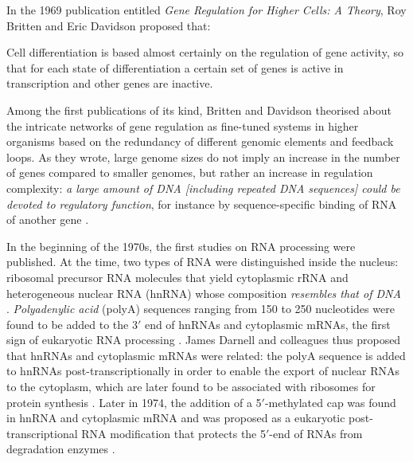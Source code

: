 In the 1969 publication entitled \emph{Gene Regulation for Higher Cells: A Theory}, Roy Britten and Eric Davidson proposed that:

\begin{displayquote}
Cell differentiation is based almost certainly on the regulation of gene activity, so that for each state of differentiation a certain set of genes is active in transcription and other genes are inactive.
\end{displayquote}

Among the first publications of its kind, Britten and Davidson theorised about the intricate networks of gene regulation as fine-tuned systems in higher organisms based on the redundancy of different genomic elements and feedback loops. As they wrote, large genome sizes do not imply an increase in the number of genes compared to smaller genomes, but rather an increase in regulation complexity: \emph{a large amount of DNA [including repeated DNA sequences] could be devoted to regulatory function}, for instance by sequence-specific binding of RNA of another gene \cite{britten:1969va}. 

In the beginning of the 1970s, the first studies on RNA processing were published. At the time, two types of RNA were distinguished inside the nucleus: ribosomal precursor RNA molecules that yield cytoplasmic rRNA and heterogeneous nuclear RNA (hnRNA) whose composition \emph{resembles that of DNA} \cite{darnell:1971tg}. \emph{Polyadenylic acid} (polyA) sequences ranging from 150 to 250 nucleotides were found to be added to the 3$'$ end of hnRNAs and cytoplasmic mRNAs, the first sign of eukaryotic RNA processing \cite{darnell:1971tg,edmonds:1971vr}. James Darnell and colleagues thus proposed that hnRNAs and cytoplasmic mRNAs were related: the polyA sequence is added to hnRNAs post-transcriptionally in order to enable the export of nuclear RNAs to the cytoplasm, which are later found to be associated with ribosomes for protein synthesis \cite{darnell:1971tg,edmonds:1971vr}. Later in 1974, the addition of a 5$'$-methylated cap was found in hnRNA and cytoplasmic mRNA and was proposed as a eukaryotic post-transcriptional RNA modification that protects the 5$'$-end of RNAs from degradation enzymes \cite{perry:1974uj,rottman:1974tk}.




